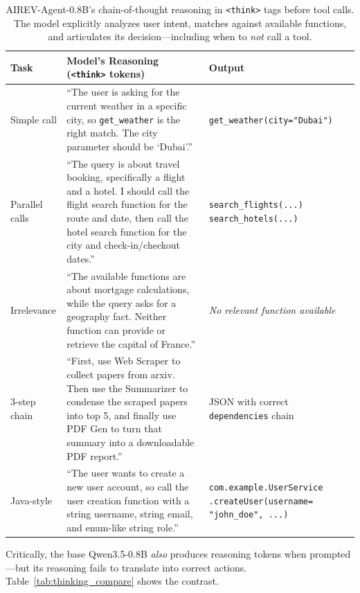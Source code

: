 \documentclass[10pt,twocolumn]{article}
\begin{document}
\begin{table}[!htbp]
\centering
\caption{AIREV-Agent-0.8B's chain-of-thought reasoning in \texttt{<think>} tags before tool calls. The model explicitly analyzes user intent, matches against available functions, and articulates its decision---including when to \textit{not} call a tool.}
\label{tab:thinking}
\small
\begin{tabularx}{\textwidth}{p{1.8cm}|X|X}
\toprule
\textbf{Task} & \textbf{Model's Reasoning (\texttt{<think>} tokens)} & \textbf{Output} \\
\midrule
Simple call & ``The user is asking for the current weather in a specific city, so \texttt{get\_weather} is the right match. The city parameter should be `Dubai'.'' & \texttt{get\_weather(city="Dubai")} \\
\midrule
Parallel calls & ``The query is about travel booking, specifically a flight and a hotel. I should call the flight search function for the route and date, then call the hotel search function for the city and check-in/checkout dates.'' & \texttt{search\_flights(...)} \newline \texttt{search\_hotels(...)} \\
\midrule
Irrelevance & ``The available functions are about mortgage calculations, while the query asks for a geography fact. Neither function can provide or retrieve the capital of France.'' & \textit{No relevant function available} \\
\midrule
3-step chain & ``First, use Web Scraper to collect papers from arxiv. Then use the Summarizer to condense the scraped papers into top 5, and finally use PDF Gen to turn that summary into a downloadable PDF report.'' & JSON with correct \texttt{dependencies} chain \\
\midrule
Java-style & ``The user wants to create a new user account, so call the user creation function with a string username, string email, and enum-like string role.'' & \texttt{com.example.UserService .createUser(username= "john\_doe", ...)} \\
\bottomrule
\end{tabularx}
\end{table}

Critically, the base Qwen3.5-0.8B \textit{also} produces reasoning tokens when prompted---but its reasoning fails to translate into correct actions. Table~\ref{tab:thinking_compare} shows the contrast.
\end{document}
